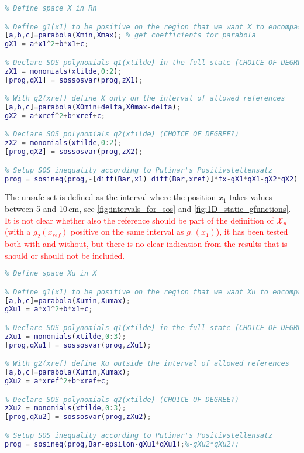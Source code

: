 \begin{lstlisting}[language=matlab]
% =============================================
% Define space X in Rn

% Define g1(x1) to be positive on the region that we want X to encompass
[a,b,c]=parabola(Xmin,Xmax); % get coefficients for parabola
gX1 = a*x1^2+b*x1+c;

% Declare SOS polynomials q1(xtilde) in the full state (CHOICE OF DEGREEE?)
zX1 = monomials(xtilde,0:2); 
[prog,qX1] = sossosvar(prog,zX1);

% With g2(xref) define X only on the interval of allowed references
[a,b,c]=parabola(X0min+delta,X0max-delta);
gX2 = a*xref^2+b*xref+c;

% Declare SOS polynomials q2(xtilde) (CHOICE OF DEGREE?)
zX2 = monomials(xtilde,0:2);
[prog,qX2] = sossosvar(prog,zX2);

% Setup SOS inequality according to Putinar's Positivstellensatz
prog = sosineq(prog,-[diff(Bar,x1) diff(Bar,xref)]*fx-gX1*qX1-gX2*qX2);
\end{lstlisting}
The unsafe set is defined as the interval where the position $x_1$ takes values between 5 and 10\,cm, see \autoref{fig:intervals_for_sos} and \ref{fig:1D_static_gfunctions}. \textcolor{red}{It is not clear whether also the reference should be part of the definition of $\mathcal{X}_u$ (with a $g_2(x_{ref})$ positive on the same interval as $g_1(x_1)$), it has been tested both with and without, but there is no clear indication from the results that is should or should not be included.}
\begin{lstlisting}[language=matlab]
% =============================================
% Define space Xu in X

% Define g1(x1) to be positive on the region that we want Xu to encompass
[a,b,c]=parabola(Xumin,Xumax);
gXu1 = a*x1^2+b*x1+c;

% Declare SOS polynomials q1(xtilde) in the full state (CHOICE OF DEGREEE?)
zXu1 = monomials(xtilde,0:3);
[prog,qXu1] = sossosvar(prog,zXu1);

% With g2(xref) define Xu outside the interval of allowed references
[a,b,c]=parabola(Xumin,Xumax);
gXu2 = a*xref^2+b*xref+c;

% Declare SOS polynomials q2(xtilde) (CHOICE OF DEGREE?)
zXu2 = monomials(xtilde,0:3);
[prog,qXu2] = sossosvar(prog,zXu2);

% Setup SOS inequality according to Putinar's Positivstellensatz
prog = sosineq(prog,Bar-epsilon-gXu1*qXu1);%-gXu2*qXu2);
\end{lstlisting}
